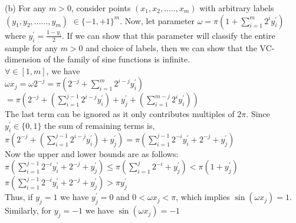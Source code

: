 \documentclass[10pt]{article}
\begin{document}
\begin{flushleft}
\vspace{0.5em}
(b) For any $m>0$, consider points $(x_{1}, x_{2},....., x_{m})$ with arbitrary labels $(y_{1}, y_{2},......, y_{m})$ $\in \{-1, +1\}^{m}$. Now, let parameter $\omega = \pi(1+ \sum\limits_{i=1}^{m} 2^{i} y_{i}^{'})$ where $y_{i}^{'} = \frac{1-y_{i}}{2}$. If we can show that this parameter will classify the entire sample for any $m>0$ and choice of labels, then we can show that the VC-dimension of the family of sine functions is infinite.\\
\vspace{0.5em}
$\forall \in [1,m]$, we have\\
\hspace{2em} $\omega x_{j} = \omega 2^{-j} = \pi(2^{-j} + \sum\limits_{i=1}^{m} 2^{i-j} y_{i}^{'})$\\
\hspace{7.5em}$= \pi(2^{-j} + (\sum\limits_{i=1}^{j-1} 2^{i-j} y_{i}^{'}) + y_{j}^{'} + (\sum\limits_{i=1}^{m-j} 2^{i} y_{i}^{'}))$\\
\vspace{0.5em}
The last term can be ignored as it only contributes multiples of $2\pi$. Since $y_{i}^{'} \in \{0,1\}$ the sum of remaining terms is, $\pi(2^{-j} + (\sum\limits_{i=1}^{j-1} 2^{i-j} y_{i}^{'}) + y_{j}^{'}) = \pi(\sum\limits_{i=1}^{j-1} 2^{-i}y_{i}^{'} + 2^{-j}+ y_{j}^{'})$\\
Now the upper and lower bounds are as follows:\\
\vspace{0.5em}
\hspace{2em}$\pi(\sum\limits_{i=1}^{j-1} 2^{-i}y_{i}^{'} + 2^{-j} + y_{j}^{'}) \leq \pi(\sum\limits_{i=1}^{j} 2^{-i} + y_{j}^{'}) < \pi(1+y_{j}^{'})$\\
\hspace{2em}$\pi(\sum\limits_{i=1}^{j-1} 2^{-i}y_{i}^{'} + 2^{-j} + y_{j}^{'}) > \pi y_{j}^{'}$\\
Thus, if $y_{j} = 1$ we have $y_{j}^{'} = 0$ and $0< \omega x_{j} < \pi$, which implies $\sin(\omega x_{j}) = 1$. Similarly, for $y_{j} = -1$ we have $\sin(\omega x_{j}) = -1$
\end{flushleft}
\end{document}
